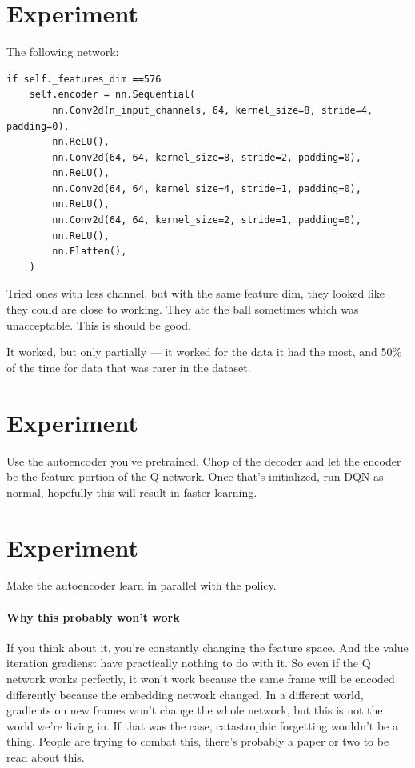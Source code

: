 \documentclass{article}
\begin{document}
\section{Experiment}
The following network:
\begin{verbatim}
if self._features_dim ==576 
    self.encoder = nn.Sequential(
        nn.Conv2d(n_input_channels, 64, kernel_size=8, stride=4, padding=0),
        nn.ReLU(),
        nn.Conv2d(64, 64, kernel_size=8, stride=2, padding=0),
        nn.ReLU(),
        nn.Conv2d(64, 64, kernel_size=4, stride=1, padding=0),
        nn.ReLU(),
        nn.Conv2d(64, 64, kernel_size=2, stride=1, padding=0),
        nn.ReLU(),
        nn.Flatten(),
    )

\end{verbatim}

Tried ones with less channel, but with the same feature dim, they looked like they could 
are close to working.
They ate the ball sometimes which was unacceptable.
This is should be good.

It worked, but only partially --- it worked for the data it had the most,
and 50\% of the time for data that was rarer in the dataset.


\section{Experiment}
Use the autoencoder you've pretrained.
Chop of the decoder and let the encoder be the feature portion of the Q-network.
Once that's initialized, run DQN as normal, hopefully this will result in faster learning.

\section{Experiment}
Make the autoencoder learn in parallel with the policy.
\paragraph{Why this probably won't work}
If you think about it, you're constantly changing the feature space.
And the value iteration gradienst have practically nothing to do with it.
So even if the Q network works perfectly, it won't work because the same 
frame will be encoded differently because the embedding network changed.
In a different world, gradients on new frames won't change the whole network,
but this is not the world we're living in.
If that was the case, catastrophic forgetting wouldn't be a thing.
People are trying to combat this, there's probably a paper or two to be read about this.
\end{document}

